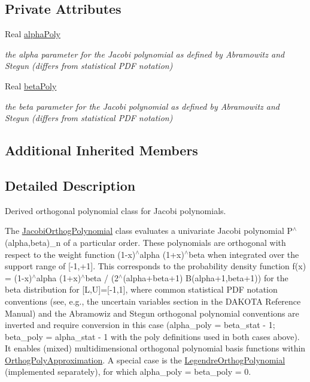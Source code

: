 \subsection*{Private Attributes}
\begin{DoxyCompactItemize}
\item 
Real \hyperlink{classPecos_1_1JacobiOrthogPolynomial_a11666846719189915a02ac6f1f96e393}{alpha\+Poly}\label{classPecos_1_1JacobiOrthogPolynomial_a11666846719189915a02ac6f1f96e393}

\begin{DoxyCompactList}\small\item\em the alpha parameter for the Jacobi polynomial as defined by Abramowitz and Stegun (differs from statistical P\+DF notation) \end{DoxyCompactList}\item 
Real \hyperlink{classPecos_1_1JacobiOrthogPolynomial_a96c0b0201ca445f95be14ec035b595cb}{beta\+Poly}\label{classPecos_1_1JacobiOrthogPolynomial_a96c0b0201ca445f95be14ec035b595cb}

\begin{DoxyCompactList}\small\item\em the beta parameter for the Jacobi polynomial as defined by Abramowitz and Stegun (differs from statistical P\+DF notation) \end{DoxyCompactList}\end{DoxyCompactItemize}
\subsection*{Additional Inherited Members}


\subsection{Detailed Description}
Derived orthogonal polynomial class for Jacobi polynomials. 

The \hyperlink{classPecos_1_1JacobiOrthogPolynomial}{Jacobi\+Orthog\+Polynomial} class evaluates a univariate Jacobi polynomial P$^\wedge$(alpha,beta)\+\_\+n of a particular order. These polynomials are orthogonal with respect to the weight function (1-\/x)$^\wedge$alpha (1+x)$^\wedge$beta when integrated over the support range of \mbox{[}-\/1,+1\mbox{]}. This corresponds to the probability density function f(x) = (1-\/x)$^\wedge$alpha (1+x)$^\wedge$beta / (2$^\wedge$(alpha+beta+1) B(alpha+1,beta+1)) for the beta distribution for \mbox{[}L,U\mbox{]}=\mbox{[}-\/1,1\mbox{]}, where common statistical P\+DF notation conventions (see, e.\+g., the uncertain variables section in the D\+A\+K\+O\+TA Reference Manual) and the Abramowiz and Stegun orthogonal polynomial conventions are inverted and require conversion in this case (alpha\+\_\+poly = beta\+\_\+stat -\/ 1; beta\+\_\+poly = alpha\+\_\+stat -\/ 1 with the poly definitions used in both cases above). It enables (mixed) multidimensional orthogonal polynomial basis functions within \hyperlink{classPecos_1_1OrthogPolyApproximation}{Orthog\+Poly\+Approximation}. A special case is the \hyperlink{classPecos_1_1LegendreOrthogPolynomial}{Legendre\+Orthog\+Polynomial} (implemented separately), for which alpha\+\_\+poly = beta\+\_\+poly = 0. 


